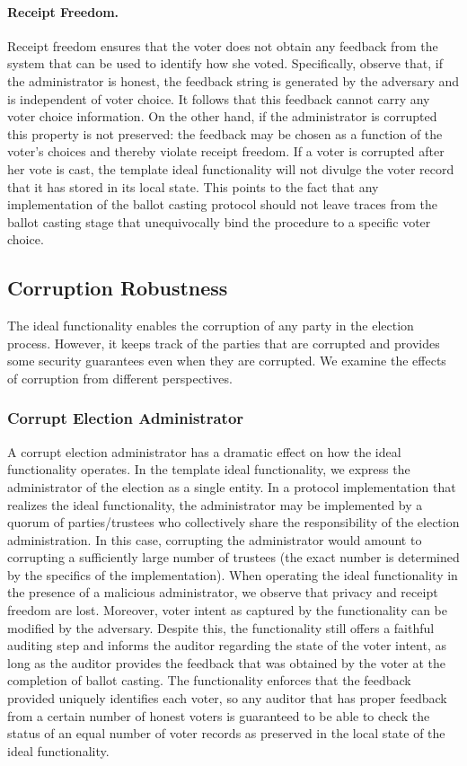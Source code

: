 \paragraph{Receipt Freedom.} Receipt freedom ensures that the voter
does not obtain any feedback from the system that can be used to
identify how she voted. Specifically, observe that, if the
administrator is honest, the feedback string is generated by the
adversary and is independent of voter choice. It follows that this
feedback cannot carry any voter choice information. On the other hand,
if the administrator is corrupted this property is not preserved: the
feedback may be chosen as a function of the voter's choices and
thereby violate receipt freedom. If a voter is corrupted after her
vote is cast, the template ideal functionality will not divulge the
voter record that it has stored in its local state. This points to the
fact that any implementation of the ballot casting protocol should not
leave traces from the ballot casting stage that unequivocally bind the
procedure to a specific voter choice.

\subsection{Corruption Robustness}

The ideal functionality enables the corruption of any party in the
election process. However, it keeps track of the parties that are
corrupted and provides some security guarantees even when they are
corrupted. We examine the effects of corruption from different
perspectives.

\subsubsection{Corrupt Election Administrator}

A corrupt election administrator has a dramatic effect on how the
ideal functionality operates. In the template ideal functionality, we
express the administrator of the election as a single entity. In a
protocol implementation that realizes the ideal functionality, the
administrator may be implemented by a quorum of parties/trustees who
collectively share the responsibility of the election administration.
In this case, corrupting the administrator would amount to corrupting
a sufficiently large number of trustees (the exact number is
determined by the specifics of the implementation). When operating the
ideal functionality in the presence of a malicious administrator, we
observe that privacy and receipt freedom are lost. Moreover, voter
intent as captured by the functionality can be modified by the
adversary. Despite this, the functionality still offers a faithful
auditing step and informs the auditor regarding the state of the voter
intent, as long as the auditor provides the feedback that was obtained
by the voter at the completion of ballot casting. The functionality
enforces that the feedback provided uniquely identifies each voter, so
any auditor that has proper feedback from a certain number of honest
voters is guaranteed to be able to check the status of an equal number
of voter records as preserved in the local state of the ideal
functionality.

